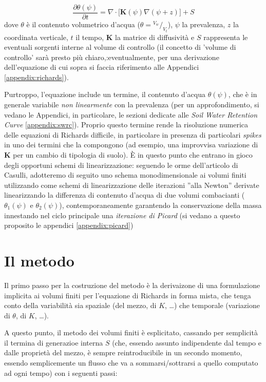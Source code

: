 \documentclass[11pt]{amsart}
\theoremstyle{definition}
\theoremstyle{remark}
\numberwithin{equation}{section}
\newcommand*\rfrac[2]{{}^{#1}\!/_{#2}}
\begin{document}
\begin{equation}
\frac{\partial \theta(\psi)}{\partial t} = \nabla\cdot\lbrack \textbf{K}(\psi)\nabla(\psi + z) \rbrack + S
\end{equation}
dove $\theta$ è il contenuto volumetrico d'acqua ($\theta=\rfrac{V_{w}}{V_t}$), $\psi$ la prevalenza, $z$ la coordinata verticale, $t$ 
il tempo, $\mathbf{K}$ la matrice di diffusivit\`a e $S$ rappresenta le eventuali sorgenti interne al volume di controllo 
(il concetto di 'volume di controllo' sarà presto più chiaro,:eventualmente, per una derivazione dell'equazione di cui sopra si faccia riferimento 
alle Appendici \ref{appendix:richards}). 

Purtroppo, l'equazione include un termine, il contenuto d'acqua $\theta(\psi)$, che è in generale variabile \emph{non linearmente} con la prevalenza (per un 
approfondimento, si vedano le Appendici, in particolare, le sezioni dedicate alle \emph{Soil Water Retention Curve} \ref{appendix:swrc}). Proprio questo 
termine rende la risoluzione numerica delle equazioni di Richards difficile, in particolare in presenza di particolari \emph{spikes} in uno dei termini che la 
compongono (ad esempio, una improvvisa variazione di \textbf{K} per un cambio di tipologia di suolo). È in questo punto che entrano in gioco degli opportuni schemi
di linearizzazione: seguendo le orme dell'articolo di Casulli, adotteremo di seguito uno schema monodimensionale ai volumi finiti utilizzando come schemi di 
linearizzazione delle iterazioni ''alla Newton'' derivate linearizzando la differenza di contenuto d'acqua di due volumi combacianti ($\theta_{1}(\psi)$ e 
$\theta_{2}(\psi)$), contemporaneamente garantendo la conservazione della massa innestando nel ciclo principale una \emph{iterazione di Picard} (si vedano a questo proposito le appendici \ref{appendix:picard})


\section{Il metodo}
\label{sec:method}
Il primo passo per la costruzione del metodo è la derivaizone di una formulazione implicita ai volumi finiti per l'equazione di Richards in forma mista, che tenga conto della variabilità sia spaziale (del mezzo, di $K$, \dots) che temporale (variazione di $\theta$, di $K$, \dots).


A questo punto, il metodo dei volumi finiti è esplicitato, cassando per semplicità il termina di generazioe interna $S$ (che, essendo assunto indipendente dal tempo e dalle proprietà del mezzo, è sempre reintroducibile in un secondo momento, essendo semplicemente un flusso che va a sommarsi/sottrarsi a quello computato ad ogni tempo) con i seguenti passi:
\end{document}
